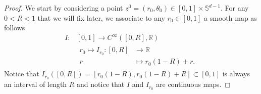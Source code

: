 \documentclass{amsart}
\theoremstyle{definition}
\theoremstyle{remark}
\numberwithin{equation}{section}
\theoremstyle{definition}
\theoremstyle{remark}
\begin{document}
\begin{proof}
We start by  considering a point $z^0=\left(r_0,\theta_0\right)\in[0,1]\times\mathbb{S}^{d-1}$. For any $0<R<1$ that we will fix later, we associate to any $r_0\in[0,1]$ a smooth map as follows\begin{equation}
       \begin{aligned}
          I: &[0,1]\rightarrow C^\infty\left([0,R],\mathbb{R}\right)\\
           &\begin{aligned}r_0\mapsto 
              I_{r_0}: [0,R]&\rightarrow\mathbb{R}\\
              r&\mapsto r_0\left(1-R\right)+r.
           \end{aligned}
       \end{aligned}
   \end{equation}Notice that $I_{r_0}\left([0,R]\right)=\left[r_0\left(1-R\right),r_0\left(1-R\right)+R\right]\subset [0,1]$ is always an interval of length $R$ and notice that $I$ and $I_{r_0}$ are continuous maps. 


\end{proof}
\end{document}
